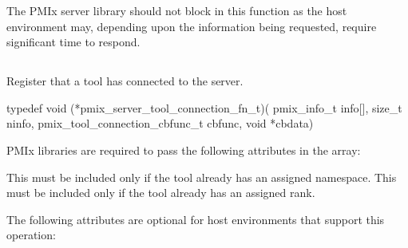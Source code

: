 \adviceimplstart
The \ac{PMIx} server library should not block in this function as the host environment may, depending upon the information being requested, require significant time to respond.
\adviceimplend



\subsection{}

\summary

Register that a tool has connected to the server.

\format

\cspecificstart
\begin{codepar}
typedef void (*pmix_server_tool_connection_fn_t)(
                             pmix_info_t info[], size_t ninfo,
                             pmix_tool_connection_cbfunc_t cbfunc,
                             void *cbdata)
\end{codepar}
\cspecificend

\begin{arglist}
\end{arglist}

\reqattrstart
\ac{PMIx} libraries are required to pass the following attributes in the  array:

This must be included only if the tool already has an assigned namespace.
\pasteAttributeItemEnd{}
This must be included only if the tool already has an assigned rank.
\pasteAttributeItemEnd{}

\reqattrend


\optattrstart
The following attributes are optional for host environments that support this operation:


